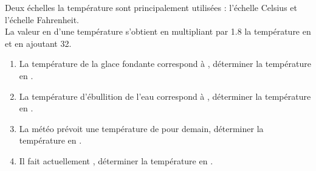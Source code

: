 \begin{exercice*}
   Deux échelles la température sont principalement utilisées : l'échelle Celsius et l'échelle Fahrenheit. \\
   La valeur en \Temp[F]{} d'une température s'obtient en multipliant par \num{1.8} la température en \Temp{} et en ajoutant 32.
   \begin{enumerate}
      \item La température de la glace fondante correspond à , déterminer la température en \Temp[F]{}.
      \item La température d'ébullition de l'eau correspond à , déterminer la température en \Temp[F]{}.
      \item La météo prévoit une température de  pour demain, déterminer la température en \Temp[F]{}.
      \item Il fait actuellement , déterminer la température en \Temp{}.
   \end{enumerate}
\end{exercice*}